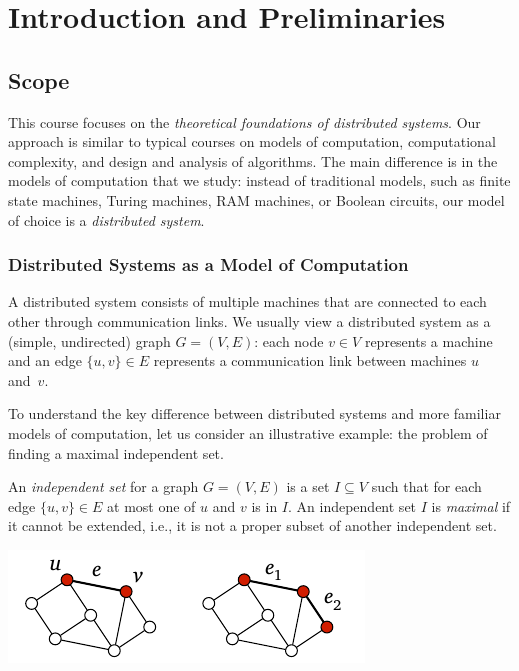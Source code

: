 
\chapter{Introduction and Preliminaries}

\section{Scope}

This course focuses on the \emph{theoretical foundations of distributed systems}. Our approach is similar to typical courses on models of computation, computational complexity, and design and analysis of algorithms. The main difference is in the models of computation that we study: instead of traditional models, such as finite state machines, Turing machines, RAM machines, or Boolean circuits, our model of choice is a \emph{distributed system}.

\subsection{Distributed Systems as a Model of Computation}\label{ssec:prelim-model}

A distributed system consists of multiple machines that are connected to each other through communication links. We usually view a distributed system as a (simple, undirected) graph $G = (V,E)$: each node $v \in V$ represents a machine and an edge $\{u,v\} \in E$ represents a communication link between machines $u$ and~$v$.

To understand the key difference between distributed systems and more familiar models of computation, let us consider an illustrative example: the problem of finding a maximal independent set.

An \emph{independent set} for a graph $G = (V,E)$ is a set $I \subseteq V$ such that for each edge $\{u,v\} \in E$ at most one of $u$ and $v$ is in $I$. An independent set $I$ is \emph{maximal} if it cannot be extended, i.e., it is not a proper subset of another independent set.
\begin{center}
    \includegraphics[page=\PIndependentSet]{figs.pdf}
\end{center}

